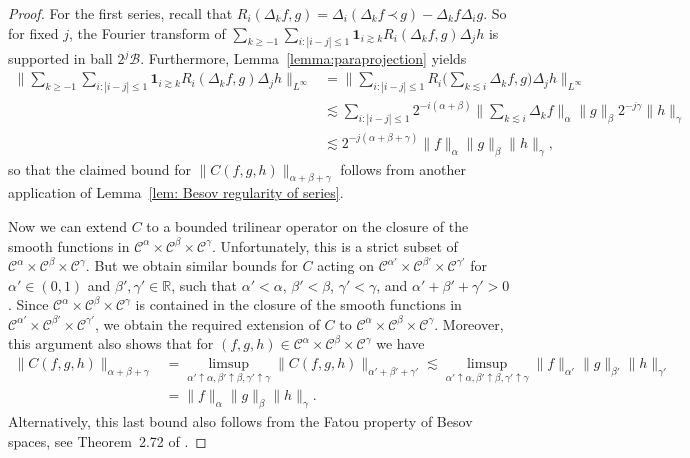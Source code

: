 \documentclass[a4paper,11pt]{article}
\theoremstyle{remark}
\newcommand{\CB}{\ensuremath{\mathscr{B}}}
\newcommand{\CC}{\ensuremath{\mathscr{C}}}
\newcommand{\lpara}{\,\mathord{\prec}\,}
\begin{document}
\begin{proof}
  For the first series, recall that $R_{i} ( \Delta_{k} f,g ) = \Delta_{i} ( \Delta_{k} f \lpara g ) - \Delta_{k} f \Delta_{i} g$. So for fixed $j$, the
  Fourier transform of $\sum_{k \geqslant -1} \sum_{i: | i-j | \leqslant 1} \mathbf{1}_{i \gtrsim k} R_{i} ( \Delta_{k} f,g ) \Delta_{j} h$ is
  supported in ball $2^{j} \CB$. Furthermore,
  Lemma~\ref{lemma:paraprojection} yields
  \begin{align*}
     \Bigg\| \sum_{k \geqslant -1} \sum_{i: | i-j | \leqslant 1} \mathbf{1}_{i \gtrsim k} R_{i} ( \Delta_{k} f,g ) \Delta_{j} h \Bigg\|_{L^{\infty}} & = \Bigg\| \sum_{i: | i-j | \leqslant 1} R_{i}  \Bigg( \sum_{k \lesssim i} \Delta_{k} f,g \Bigg) \Delta_{j} h  \Bigg\|_{L^{\infty}} \\
     & \lesssim \sum_{i: | i-j | \leqslant 1} 2^{-i ( \alpha + \beta )} \bigg\| \sum_{k \lesssim i} \Delta_{k} f \bigg\|_{\alpha} \| g \|_{\beta} 2^{-j \gamma} \| h \|_{\gamma} \\
     &\lesssim 2^{-j ( \alpha + \beta + \gamma )} \| f \|_{\alpha} \| g \|_{\beta} \| h \|_{\gamma},
  \end{align*}
  so that the claimed bound for $\| C ( f,g,h ) \|_{\alpha + \beta + \gamma}$
  follows from another application of Lemma~\ref{lem: Besov regularity of series}.
  
  Now we can extend $C$ to a bounded trilinear operator on the
  closure of the smooth functions in $\CC^{\alpha} \times \CC^{\beta} \times \CC^{\gamma}$. Unfortunately, this is a strict subset of
  $\CC^{\alpha} \times \CC^{\beta} \times \CC^{\gamma}$. But we obtain similar bounds for $C$ acting on $\CC^{\alpha'} \times \CC^{\beta'} \times \CC^{\gamma'}$ for $\alpha' \in ( 0,1 )$ and
  $\beta' , \gamma' \in \mathbb{R}$, such that $\alpha' < \alpha$, $\beta' < \beta$, $\gamma' < \gamma$, and $\alpha' + \beta'+ \gamma' >0$. Since
  $\CC^{\alpha} \times \CC^{\beta} \times \CC^{\gamma}$ is contained in the
  closure of the smooth functions in $\CC^{\alpha'} \times \CC^{\beta'} \times \CC^{\gamma'}$, we obtain the required extension of $C$ to $\CC^{\alpha} \times \CC^{\beta} \times \CC^{\gamma}$. Moreover, this argument also shows that for $(f,g,h) \in \CC^{\alpha} \times \CC^{\beta} \times \CC^{\gamma}$ we have
  \begin{align*}
    \| C(f,g,h)\|_{\alpha+\beta+\gamma} &= \limsup_{\alpha'\uparrow \alpha, \beta' \uparrow \beta, \gamma'\uparrow\gamma} \| C(f,g,h)\|_{\alpha'+\beta'+\gamma'} \lesssim \limsup_{\alpha'\uparrow \alpha, \beta' \uparrow \beta, \gamma'\uparrow\gamma} \|f\|_{\alpha'} \|g \|_{\beta'} \|h\|_{\gamma'}\\
    &= \|f\|_{\alpha} \|g \|_{\beta} \|h\|_{\gamma}.
  \end{align*}
  Alternatively, this last bound also follows from the Fatou property of Besov spaces, see Theorem~2.72 of \cite{Bahouri2011}.
\end{proof}
\end{document}
